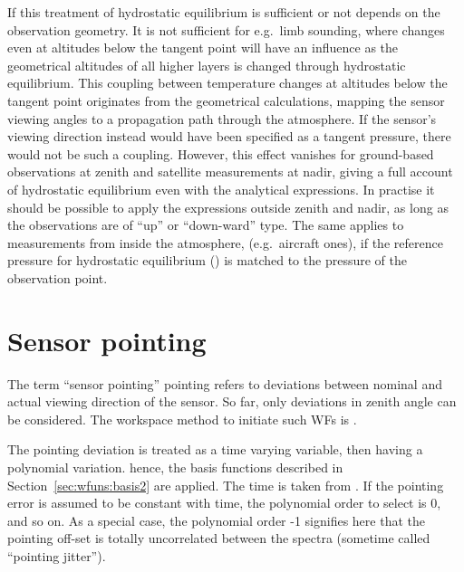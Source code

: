 If this treatment of hydrostatic equilibrium is sufficient or not depends on
the observation geometry. It is not sufficient for e.g.\ limb sounding, where
changes even at altitudes below the tangent point will have an influence as the
geometrical altitudes of all higher layers is changed through hydrostatic
equilibrium. This coupling between temperature changes at altitudes below the
tangent point originates from the geometrical calculations, mapping the sensor
viewing angles to a propagation path through the atmosphere. If the sensor's
viewing direction instead would have been specified as a tangent pressure, there
would not be such a coupling. However, this effect vanishes for ground-based
observations at zenith and satellite measurements at nadir, giving a full
account of hydrostatic equilibrium even with the analytical expressions. In
practise it should be possible to apply the expressions outside zenith and
nadir, as long as the observations are of ``up'' or ``down-ward'' type. The
same applies to measurements from inside the atmosphere, (e.g.\ aircraft ones),
if the reference pressure for hydrostatic equilibrium ()
is matched to the pressure of the observation point.





\section{Sensor pointing}
\label{sec:wfuns:sensorpointing}

The term ``sensor pointing'' pointing refers to deviations between nominal and
actual viewing direction of the sensor. So far, only deviations in zenith angle
can be considered. The workspace method to initiate such WFs is
.

The pointing deviation is treated as a time varying variable, then having a
polynomial variation. hence, the basis functions described in
Section~\ref{sec:wfuns:basis2} are applied. The time is taken from
. If the pointing error is assumed to be constant with
time, the polynomial order to select is 0, and so on. As a special case, the
polynomial order -1 signifies here that the pointing off-set is totally
uncorrelated between the spectra (sometime called ``pointing jitter'').

